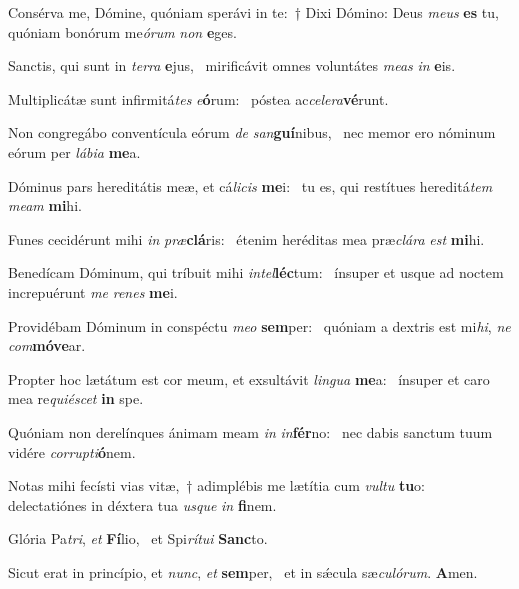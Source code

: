 \item Consérva me, Dómine, quóniam sperávi in te:~† Dixi Dómino: Deus \textit{meus} \textbf{es} tu,~\psstar{} quóniam bonórum me\textit{órum} \textit{non} \textbf{e}ges.
\item Sanctis, qui sunt in \textit{terra} \textbf{e}jus,~\psstar{} mirificávit omnes voluntátes \textit{meas} \textit{in} \textbf{e}is.
\item Multiplicátæ sunt infirmitá\textit{tes} \textit{e}\textbf{ó}rum:~\psstar{} póstea ac\textit{celera}\textbf{vé}runt.
\item Non congregábo conventícula eórum \textit{de} \textit{san}\textbf{guí}nibus,~\psstar{} nec memor ero nóminum eórum per \textit{lábia} \textbf{me}a.
\item Dóminus pars hereditátis meæ, et cá\textit{licis} \textbf{me}i:~\psstar{} tu es, qui restítues hereditá\textit{tem} \textit{meam} \textbf{mi}hi.
\item Funes cecidérunt mihi \textit{in} \textit{præ}\textbf{clá}ris:~\psstar{} étenim heréditas mea præ\textit{clára} \textit{est} \textbf{mi}hi.
\item Benedícam Dóminum, qui tríbuit mihi \textit{intel}\textbf{léc}tum:~\psstar{} ínsuper et usque ad noctem increpuérunt \textit{me} \textit{renes} \textbf{me}i.
\item Providébam Dóminum in conspéctu \textit{meo} \textbf{sem}per:~\psstar{} quóniam a dextris est mi\textit{hi}, \textit{ne} \textit{com}\textbf{mó}\textbf{ve}ar.
\item Propter hoc lætátum est cor meum, et exsultávit \textit{lingua} \textbf{me}a:~\psstar{} ínsuper et caro mea re\textit{quiéscet} \textbf{in} spe.
\item Quóniam non derelínques ánimam meam \textit{in} \textit{in}\textbf{fér}no:~\psstar{} nec dabis sanctum tuum vidére \textit{corrupti}\textbf{ó}nem.
\item Notas mihi fecísti vias vitæ,~† adimplébis me lætítia cum \textit{vultu} \textbf{tu}o:~\psstar{} delectatiónes in déxtera tua \textit{usque} \textit{in} \textbf{fi}nem.
\item Glória Pa\textit{tri}, \textit{et} \textbf{Fí}lio,~\psstar{} et Spi\textit{rítui} \textbf{Sanc}to.
\item Sicut erat in princípio, et \textit{nunc}, \textit{et} \textbf{sem}per,~\psstar{} et in sǽcula sæ\textit{culórum}. \textbf{A}men.
